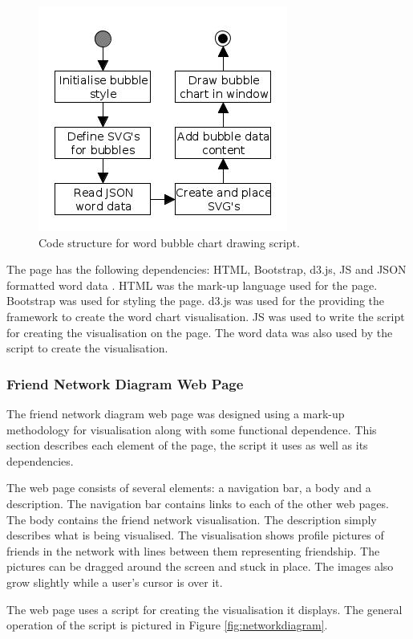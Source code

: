\documentclass[12pt,onecolumn]{article}
\begin{document}
		\begin{figure}[h]
			\centering
			\includegraphics[scale=1]{bubbles}
			\caption{Code structure for word bubble chart drawing script.} \label{fig:wordchart}
		\end{figure}

	The page has the following dependencies: HTML, Bootstrap, d3.js, JS and JSON formatted word data \cite{Bootstrap, D3, JSON}. HTML was the mark-up language used for the page. Bootstrap was used for styling the page. d3.js was used for the providing the framework to create the word chart visualisation. JS was used to write the script for creating the visualisation on the page. The word data was also used by the script to create the visualisation.
	
	\subsubsection{Friend Network Diagram Web Page}
	The friend network diagram web page was designed using a mark-up methodology for visualisation along with some functional dependence. This section describes each element of the page, the script it uses as well as its dependencies.

	The web page consists of several elements: a navigation bar, a body and a description. The navigation bar contains links to each of the other web pages. The body contains the friend network visualisation. The description simply describes what is being visualised. The visualisation shows profile pictures of friends in the network with lines between them representing friendship. The pictures can be dragged around the screen and stuck in place. The images also grow slightly while a user's cursor is over it.
	
	The web page uses a script for creating the visualisation it displays.  The general operation of the script is pictured in Figure \ref{fig:networkdiagram}.
	
\end{document}
